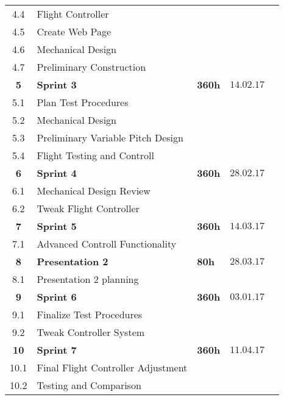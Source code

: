 \begin{center}
\begin{tabular}{cllll}
4.4     & Flight Controller & & \\
4.5     & Create Web Page & &  
\\\rowcolor{gainsboro}
4.6     & Mechanical Design & & \\
4.7     & Preliminary Construction & & 
\\\rowcolor{gainsboro}
\textbf{5} & \textbf{Sprint 3}     & \textbf{360h}     & $14.02.17$ \\
5.1     & Plan Test Procedures &  &  \\\rowcolor{gainsboro}
5.2     & Mechanical Design &  &  \\
5.3     & Preliminary Variable Pitch Design & & \\ \rowcolor{gainsboro}
5.4     & Flight Testing and Controll &  & \\
\textbf{6} & \textbf{Sprint 4}     & \textbf{360h}     & $28.02.17$ \\
\rowcolor{gainsboro}
6.1     & Mechanical Design Review & & \\
6.2     & Tweak Flight Controller & & \\
\rowcolor{gainsboro}
\textbf{7} & \textbf{Sprint 5}     & \textbf{360h}     & $14.03.17$ \\
7.1     & Advanced Controll Functionality &  & \\\rowcolor{gainsboro}
\textbf{8} & \textbf{Presentation 2}     & \textbf{80h}     & $28.03.17$ \\
8.1     & Presentation 2 planning &  &  \\\rowcolor{gainsboro}
\textbf{9} & \textbf{Sprint 6}     & \textbf{360h}     & $03.01.17$ \\
9.1     & Finalize Test Procedures &  & 
\\\rowcolor{gainsboro}
9.2     & Tweak Controller System &  & \\
\textbf{10} & \textbf{Sprint 7}     & \textbf{360h}     & $11.04.17$ \\
\rowcolor{gainsboro}
10.1     & Final Flight Controller Adjustment &  & \\
10.2     & Testing and Comparison & & \\
\end{tabular}                                                                   
\end{center}
\vfill

